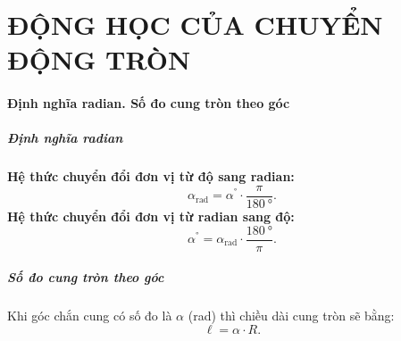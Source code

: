 \chapter{ĐỘNG HỌC CỦA CHUYỂN ĐỘNG TRÒN}
\begin{tomtat}
	\subsubsection{Định nghĩa radian. Số đo cung tròn theo góc}
	\paragraph{Định nghĩa radian}
	\begin{boxdn}
		\textbf{Hệ thức chuyển đổi đơn vị từ độ sang radian:}
		$$\alpha_{\si{\radian}}=\alpha^{\si{\degree}}\cdot\dfrac{\pi}{\SI{180}{\degree}}.$$
		\textbf{Hệ thức chuyển đổi đơn vị từ radian sang độ:}
		$$\alpha^{\si{\degree}}=\alpha_{\si{\radian}}\cdot\dfrac{\SI{180}{\degree}}{\pi}.$$
	\end{boxdn}
	\paragraph{Số đo cung tròn theo góc}
	\begin{boxdn}
		Khi góc chắn cung có số đo là $\alpha$ (\si{\radian}) thì chiều dài cung tròn sẽ bằng:
		$$\ell=\alpha\cdot R.$$
	\end{boxdn}

\end{tomtat}
